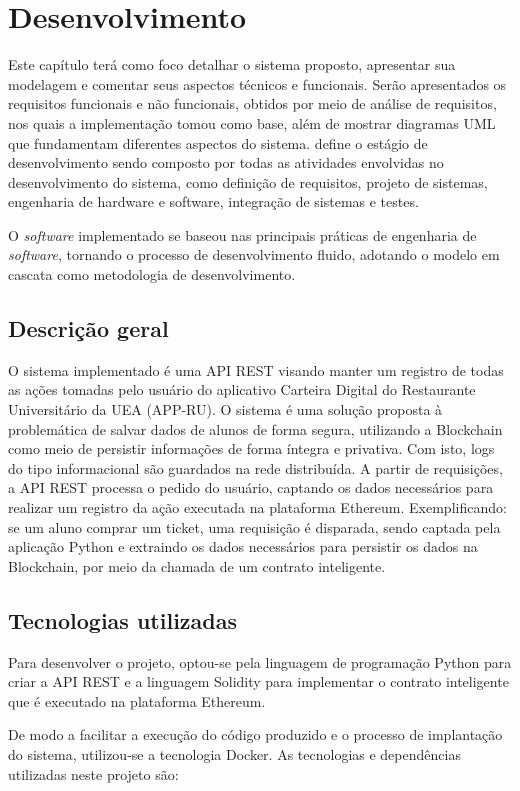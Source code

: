\chapter{Desenvolvimento}
Este capítulo terá como foco detalhar o sistema proposto, apresentar sua modelagem e comentar seus aspectos técnicos e funcionais. Serão apresentados os requisitos funcionais e não funcionais, obtidos por meio de análise de requisitos, nos quais a implementação tomou como base, além de mostrar diagramas UML que fundamentam diferentes aspectos do sistema. \cite{Sommerville2011} define o estágio de desenvolvimento sendo composto por todas as atividades envolvidas no desenvolvimento do sistema, como definição de requisitos, projeto de sistemas, engenharia de hardware e software, integração de sistemas e testes.

O \emph{software} implementado se baseou nas principais práticas de engenharia de \emph{software}, tornando o processo de desenvolvimento fluido, adotando o modelo em cascata como metodologia de desenvolvimento.

\section{Descrição geral}
O sistema implementado é uma API REST visando manter um registro de todas as ações tomadas pelo usuário do aplicativo Carteira Digital do Restaurante Universitário da UEA (APP-RU). O sistema é uma solução proposta à problemática de salvar dados de alunos de forma segura, utilizando a Blockchain como meio de persistir informações de forma íntegra e privativa. Com isto, logs do tipo informacional são guardados na rede distribuída. A partir de requisições, a API REST processa o pedido do usuário, captando os dados necessários para realizar um registro da ação executada na plataforma Ethereum. Exemplificando: se um aluno comprar um ticket, uma requisição é disparada, sendo captada pela aplicação Python e extraindo os dados necessários para persistir os dados na Blockchain, por meio da chamada de um contrato inteligente.

\section{Tecnologias utilizadas}
Para desenvolver o projeto, optou-se pela linguagem de programação Python para criar a API REST e a linguagem Solidity para implementar o contrato inteligente que é executado na plataforma Ethereum. 

De modo a facilitar a execução do código produzido e o processo de implantação do sistema, utilizou-se a tecnologia Docker. As tecnologias e dependências utilizadas neste projeto são:


